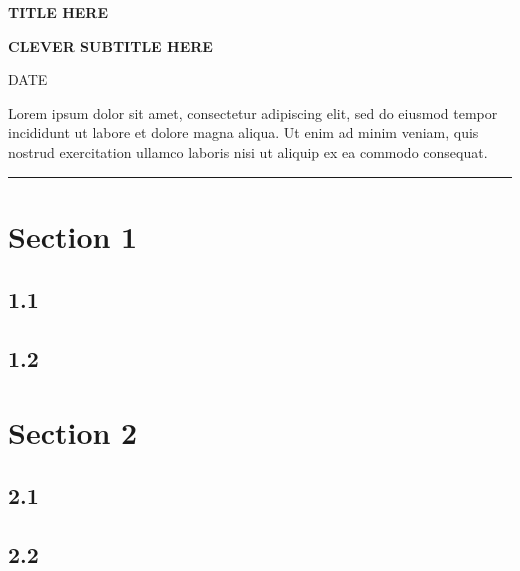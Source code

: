 \documentclass[letterpaper, 12pt]{article}
\newcommand{\mytitle}[4]{
    \begin{center}
        \begin{spacing}{1.1}
            \huge\textbf{#1}
            
            \large\textbf{#2}
        \end{spacing}

        \medskip
        {\Large #3}
    \end{center}
    \bigskip
    #4
    
    \noindent\rule{\textwidth}{1pt}
}
\begin{document}
    \mytitle{TITLE HERE}{CLEVER SUBTITLE HERE}{DATE}{
        Lorem ipsum dolor sit amet, consectetur adipiscing elit, sed do eiusmod tempor incididunt ut labore et dolore magna aliqua. Ut enim ad minim veniam, quis nostrud exercitation ullamco laboris nisi ut aliquip ex ea commodo consequat.
    }

    \section{Section 1}
        \subsection{1.1}
        \subsection{1.2}
    
    \section{Section 2}
        \subsection{2.1}
        \subsection{2.2}
\end{document}
